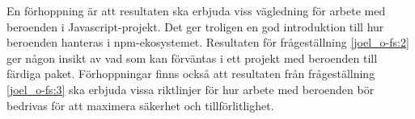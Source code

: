 En förhoppning är att resultaten ska erbjuda viss vägledning för arbete med beroenden i Javascript-projekt. Det ger troligen en god introduktion till hur beroenden hanteras i npm-ekosystemet. Resultaten för frågeställning \ref{joel_o-fs:2} ger någon insikt av vad som kan förväntas i ett projekt med beroenden till färdiga paket. Förhoppningar finns också att resultaten från frågeställning \ref{joel_o-fs:3} ska erbjuda vissa riktlinjer för hur arbete med beroenden bör bedrivas för att maximera säkerhet och tillförlitlighet.
